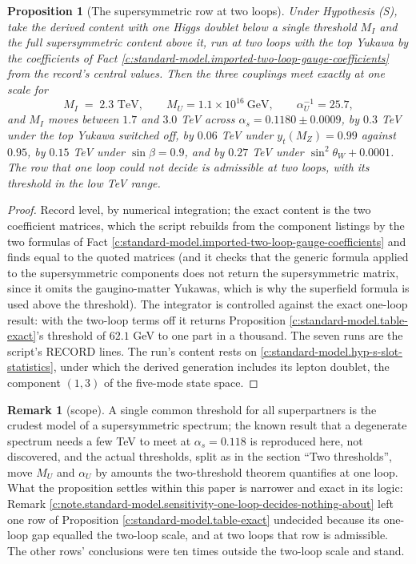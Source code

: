 \documentclass[11pt]{article}
\newtheorem{proposition}[theorem]{Proposition}
\theoremstyle{definition}
\newtheorem{remark}[theorem]{Remark}
\theoremstyle{plain}
\newcommand{\changedmark}[2]{\marginpar{\raggedright\scriptsize\color{#1}#2}}
\begin{document}
\begin{proposition}[The supersymmetric row at two loops]\label{c:standard-model.supersymmetric-row-two-loops}
\changedmark{gray}{reworded}
Under Hypothesis (S), take the derived content with one Higgs doublet below a single threshold $M_{I}$ and the full supersymmetric content above it, run at two loops with the top Yukawa by the coefficients of Fact \ref{c:standard-model.imported-two-loop-gauge-coefficients} from the record's central values. Then the three couplings meet exactly at one scale for
\[
M_{I} \;=\; 2.3 \text{ TeV}, \qquad M_{U} = 1.1 \times 10^{16}\ \text{GeV}, \qquad \alpha_{U}^{-1} = 25.7,
\]
and $M_{I}$ moves between $1.7$ and $3.0$ TeV across $\alpha_{s} = 0.1180 \pm 0.0009$, by $0.3$ TeV under the top Yukawa switched off, by $0.06$ TeV under $y_{t}(M_{Z}) = 0.99$ against $0.95$, by $0.15$ TeV under $\sin\beta = 0.9$, and by $0.27$ TeV under $\sin^{2}\theta_{W} + 0.0001$. The row that one loop could not decide is admissible at two loops, with its threshold in the low TeV range.
\end{proposition}
\begin{proof}
Record level, by numerical integration; the exact content is the two coefficient matrices, which the script rebuilds from the component listings by the two formulas of Fact \ref{c:standard-model.imported-two-loop-gauge-coefficients} and finds equal to the quoted matrices (and it checks that the generic formula applied to the supersymmetric components does not return the supersymmetric matrix, since it omits the gaugino-matter Yukawas, which is why the superfield formula is used above the threshold). The integrator is controlled against the exact one-loop result: with the two-loop terms off it returns Proposition \ref{c:standard-model.table-exact}'s threshold of $62.1$ GeV to one part in a thousand. The seven runs are the script's RECORD lines. The run's content rests on \ref{c:standard-model.hyp-s-slot-statistics}, under which the derived generation includes its lepton doublet, the component $(1,3)$ of the five-mode state space.

\end{proof}

\begin{remark}[scope]\label{c:note.standard-model.scope}
A single common threshold for all superpartners is the crudest model of a supersymmetric spectrum; the known result that a degenerate spectrum needs a few TeV to meet at $\alpha_{s} = 0.118$ is reproduced here, not discovered, and the actual thresholds, split as in the section ``Two thresholds'', move $M_{U}$ and $\alpha_{U}$ by amounts the two-threshold theorem quantifies at one loop. What the proposition settles within this paper is narrower and exact in its logic: Remark \ref{c:note.standard-model.sensitivity-one-loop-decides-nothing-about} left one row of Proposition \ref{c:standard-model.table-exact} undecided because its one-loop gap equalled the two-loop scale, and at two loops that row is admissible. The other rows' conclusions were ten times outside the two-loop scale and stand.
\end{remark}
\end{document}
